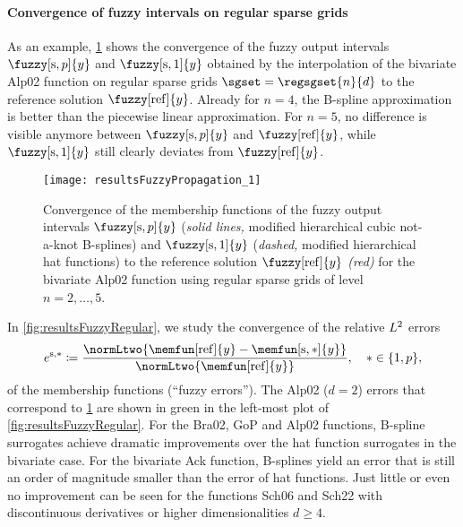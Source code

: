 \paragraph{Convergence of fuzzy intervals on regular sparse grids}

As an example,
\cref{fig:resultsFuzzyPropagation} shows the convergence of the
fuzzy output intervals $\fuzzy[\sparse,p]{y}$ and $\fuzzy[\sparse,1]{y}$
obtained by the interpolation of the
bivariate Alp02 function on regular sparse grids $\sgset = \regsgset{n}{d}$
to the reference solution $\fuzzy[\reference]{y}$.
Already for $n = 4$, the B-spline approximation is better than the
piecewise linear approximation.
For $n = 5$, no difference is visible anymore between $\fuzzy[\sparse,p]{y}$
and $\fuzzy[\reference]{y}$, while $\fuzzy[\sparse,1]{y}$ still clearly
deviates from $\fuzzy[\reference]{y}$.

\begin{SCfigure}
  \texttt{[image: resultsFuzzyPropagation\_1]}%
  \caption[Convergence of fuzzy output intervals]{%
    Convergence of the membership functions of the fuzzy output intervals
    $\fuzzy[\sparse,p]{y}$
    (\emph{solid lines,} modified hierarchical cubic not-a-knot B-splines)
    and $\fuzzy[\sparse,1]{y}$
    (\emph{dashed,} modified hierarchical hat functions)
    to the reference solution $\fuzzy[\reference]{y}$
    \emph{\textcolor{C1}{(red)}} for the bivariate Alp02 function using
    regular sparse grids of level $n = 2, \dotsc, 5$.%
  }%
  \label{fig:resultsFuzzyPropagation}%
\end{SCfigure}

In \cref{fig:resultsFuzzyRegular}, we study the convergence of the
relative $L^2$ errors
\begin{equation}
  e^{\sparse,\ast}
  \ceq \frac{
    \normLtwo{\memfun[\reference]{y} - \memfun[\sparse,\ast]{y}}
  }{
    \normLtwo{\memfun[\reference]{y}}
  },\quad
  \ast \in \{1, p\},
\end{equation}
of the membership functions (``fuzzy errors'').
The Alp02 ($d = 2$) errors
that correspond to \cref{fig:resultsFuzzyPropagation}
are shown in green in the left-most plot of \cref{fig:resultsFuzzyRegular}.
For the Bra02, GoP\punctfix{,} and Alp02 functions,
B-spline surrogates achieve
dramatic improvements over the hat function surrogates in the bivariate case.
For the bivariate Ack function, B-splines yield an error that
is still an order of magnitude smaller than the error of hat functions.
Just little or even no improvement can be seen
for the functions Sch06 and Sch22 with discontinuous derivatives or
higher dimensionalities $d \ge 4$.


